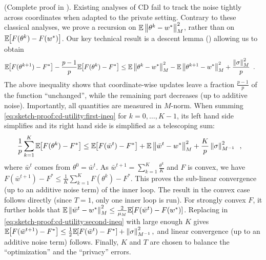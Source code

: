 \begin{sketchproof}(Complete proof in ).
  Existing analyses of CD fail to track the noise tightly
  across coordinates when adapted to the private setting. Contrary to
  these classical analyses, we prove a recursion on
  $\mathbb{E}\left \lVert \theta^k - w^* \right \rVert_M^2$, rather than on
  $\mathbb E_{} \hspace{-0.29em} \left[ F(\theta^{k}) - F(w^*) \right]$. Our key technical result is a descent
  lemma
  () allowing us to obtain
  \begin{align}
    \label{eq:sketch-proof:cd-utility:first-ineq}
     & \mathbb E_{} \hspace{-0.29em} \left[ F(\theta^{k+1}) - F^* \right] - \frac{p - 1}{p} \mathbb E_{} \hspace{-0.29em} \left[ F(\theta^k) - F^* \right]
       \le \mathbb{E}\left \lVert \theta^k - w^* \right \rVert_M^2 - \mathbb{E}\left \lVert \theta^{k+1} - w^* \right \rVert_M^2
       + \frac{\left \lVert \sigma \right \rVert_M^2}{p}
       \enspace.
  \end{align}
  The above inequality shows that coordinate-wise updates leave a fraction
  $\frac{p-1}{p}$ of the function ``unchanged'', while the remaining
  part decreases (up to additive noise). Importantly, all quantities are
  measured
  in $M$-norm. When summing
  \eqref{eq:sketch-proof:cd-utility:first-ineq} for $k=0,\dots,K-1$,
  its left hand side simplifies and its right hand side is simplified
  as a telescoping sum:
  \begin{align}
    \label{eq:sketch-proof:cd-utility:second-ineq}
     & \frac{1}{p}\sum_{k=1}^{K} \mathbb E_{} \hspace{-0.29em} \left[ F(\theta^{k}) - F^* \right]
      \le \mathbb E_{} \hspace{-0.29em} \left[ F(\bar w^t) - F^* \right] + \mathbb{E}\left \lVert \bar w^t - w^* \right \rVert_M^2
    + \frac{K}{p}\left \lVert \sigma \right \rVert_{M^{-1}}^2\enspace,
  \end{align}
  where $\bar w^t$ comes from $\theta^0 = \bar w^t$. As
  $\bar w^{t+1} = \sum_{k=1}^K \frac{\theta^k}{K}$ and $F$ is convex,
  we have
  $F(\bar w^{t+1}) - F^* \le \frac{1}{K} \sum_{k=1}^K F(\theta^k) -
    F^*$. This proves the sub-linear convergence (up to an additive
  noise term) of the inner loop. The result in the convex case follows
  directly (since $T=1$, only one inner loop is run).  For strongly
  convex $F$, it further holds that
  $\mathbb{E}\left \lVert \bar w^t - w^* \right \rVert_M^2 \le
    \frac{2}{\mu_M}\mathbb E_{} \hspace{-0.29em} \left[ F(\bar w^t) - F(w^*) \right]$.  Replacing in
  \eqref{eq:sketch-proof:cd-utility:second-ineq} with large enough $K$
  gives
  $\mathbb E_{} \hspace{-0.29em} \left[ F(\bar w^{t+1}) - F^* \right] \le \tfrac{1}{2} \mathbb E_{} \hspace{-0.29em} \left[ F(\bar
      w^{t}) - F^* \right] + \left \lVert \sigma \right \rVert_{M^{-1}}^2,$ and linear convergence
  (up to an additive noise term) follows. Finally, $K$ and $T$ are chosen to
  balance the ``optimization'' and the ``privacy'' errors.
\end{sketchproof}

